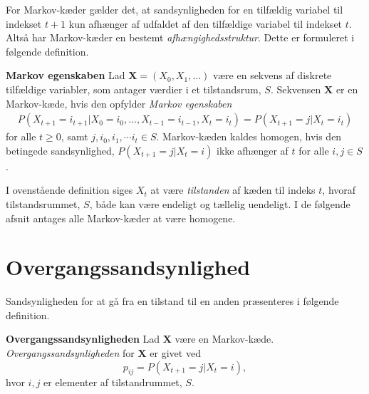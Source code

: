 
For Markov-kæder gælder det, at sandsynligheden for en tilfældig variabel til indekset $t+1$ kun afhænger af udfaldet af den tilfældige variabel til indekset $t$. Altså har Markov-kæder en bestemt \textit{afhængighedsstruktur}. Dette er formuleret i følgende definition.

\begin{minipage}\textwidth
\begin{defn}\textbf{Markov egenskaben} %
\newline
Lad $\bm{X}=(X_0, X_1, \dots)$ være en sekvens af diskrete tilfældige variabler, som antager værdier i et tilstandsrum, $S$. 
Sekvensen $\bm{X}$ er en Markov-kæde, hvis den opfylder \textit{Markov egenskaben}
\begin{align}\label{eq:markov_egenskaben}
    P(X_{t+1} = i_{t+1} | X_0 = i_0, \dots, X_{t-1} = i_{t-1}, X_t = i_t) =  P(X_{t+1} = j | X_t = i_t)
\end{align}
for alle $t\geq 0$, samt $j, i_0, i_1, \cdots i_{t} \in S$.
Markov-kæden kaldes homogen, hvis den betingede sandsynlighed, $P(X_{t+1}=j|X_t=i)$ ikke afhænger af $t$ for alle $i,j\in S$.
\end{defn}
\end{minipage}

I ovenstående definition siges $X_t$ at være \textit{tilstanden} af kæden til indeks $t$, hvoraf tilstandsrummet, $S$, både kan være endeligt og tællelig uendeligt. I de følgende afsnit antages alle Markov-kæder at være homogene.




\section{Overgangssandsynlighed}
Sandsynligheden for at gå fra en tilstand til en anden præsenteres i følgende definition.

\begin{minipage}\textwidth
\begin{defn}\textbf{Overgangssandsynligheden} \label{def:overgangssandsynlighed} %
\newline
Lad $\bm X$ være en Markov-kæde. \textit{Overgangssandsynligheden} for $\bm X$ er givet ved $$p_{ij}=P(X_{t+1}=j|X_t=i),$$
hvor $i, j$ er elementer af tilstandrummet, $S$.
\end{defn}
\end{minipage}

